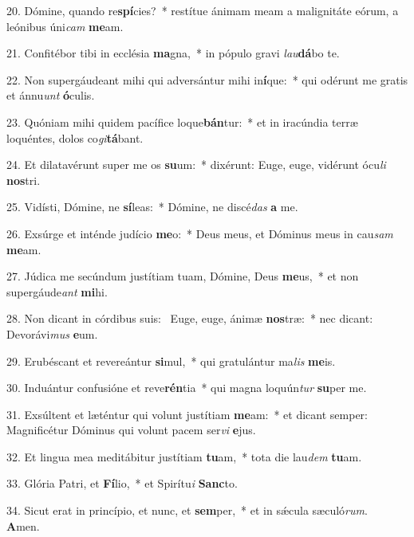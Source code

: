 20. Dómine, quando re\textbf{spí}cies?~*  restítue ánimam meam a malignitáte eórum, a leónibus úni\textit{cam} \textbf{me}am.\

21. Confitébor tibi in ecclésia \textbf{ma}gna,~*  in pópulo gravi \textit{lau}\textbf{dá}bo te.\

22. Non supergáudeant mihi qui adversántur mihi in\textbf{í}que:~*  qui odérunt me gratis et ánnu\textit{unt} \textbf{ó}culis.\

23. Quóniam mihi quidem pacífice loque\textbf{bán}tur:~*  et in iracúndia terræ loquéntes, dolos co\textit{gi}\textbf{tá}bant.\

24. Et dilatavérunt super me os \textbf{su}um:~*  dixérunt: Euge, euge, vidérunt ócu\textit{li} \textbf{nos}tri.\

25. Vidísti, Dómine, ne \textbf{sí}leas:~*  Dómine, ne discé\textit{das} \textbf{a} me.\

26. Exsúrge et inténde judício \textbf{me}o:~*  Deus meus, et Dóminus meus in cau\textit{sam} \textbf{me}am.\

27. Júdica me secúndum justítiam tuam, Dómine, Deus \textbf{me}us,~*  et non supergáude\textit{ant} \textbf{mi}hi.\

28. Non dicant in córdibus suis: \dag\  Euge, euge, ánimæ \textbf{nos}træ:~*  nec dicant: Devorávi\textit{mus} \textbf{e}um.\

29. Erubéscant et revereántur \textbf{si}mul,~*  qui gratulántur ma\textit{lis} \textbf{me}is.\

30. Induántur confusióne et reve\textbf{rén}tia~*  qui magna loquún\textit{tur} \textbf{su}per me.\

31. Exsúltent et læténtur qui volunt justítiam \textbf{me}am:~*  et dicant semper: Magnificétur Dóminus qui volunt pacem ser\textit{vi} \textbf{e}jus.\

32. Et lingua mea meditábitur justítiam \textbf{tu}am,~*  tota die lau\textit{dem} \textbf{tu}am.\

33. Glória Patri, et \textbf{Fí}lio,~*  et Spirítu\textit{i} \textbf{Sanc}to.\

34. Sicut erat in princípio, et nunc, et \textbf{sem}per,~*  et in sǽcula sæculó\textit{rum}. \textbf{A}men.\

